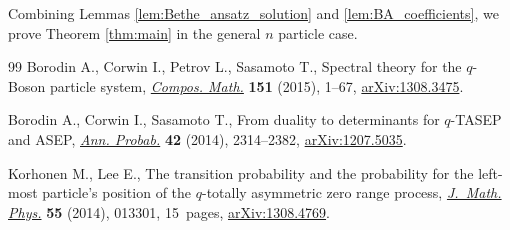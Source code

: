 \documentclass[11pt]{article}
\numberwithin{equation}{section}
\begin{document}
Combining Lemmas \ref{lem:Bethe_ansatz_solution} and \ref{lem:BA_coefficients}, we prove Theorem \ref{thm:main} in the general $n$ particle case.
\begin{thebibliography}{99}
Borodin A., Corwin I., Petrov L., Sasamoto T., Spectral theory for the
 {$q$}-{B}oson particle system, \href{http://dx.doi.org/10.1112/S0010437X14007532}{\textit{Compos. Math.}} \textbf{151} (2015),
 1--67, \href{http://arxiv.org/abs/1308.3475}{arXiv:1308.3475}.

Borodin A., Corwin I., Sasamoto T., From duality to determinants for
 {$q$}-{TASEP} and {ASEP}, \href{http://dx.doi.org/10.1214/13-AOP868}{\textit{Ann. Probab.}} \textbf{42} (2014),
 2314--2382, \href{http://arxiv.org/abs/1207.5035}{arXiv:1207.5035}.

Korhonen M., Lee E., The transition probability and the probability for the
 left-most particle's position of the {$q$}-totally asymmetric zero range
 process, \href{http://dx.doi.org/10.1063/1.4851758}{\textit{J.~Math. Phys.}} \textbf{55} (2014), 013301, 15~pages,
 \href{http://arxiv.org/abs/1308.4769}{arXiv:1308.4769}.

\end{thebibliography}
\end{document}
